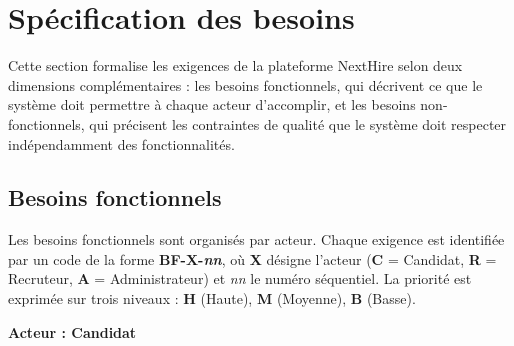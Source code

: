 \section{Spécification des besoins}

Cette section formalise les exigences de la plateforme NextHire selon deux dimensions complémentaires : les besoins fonctionnels, qui décrivent ce que le système doit permettre à chaque acteur d'accomplir, et les besoins non-fonctionnels, qui précisent les contraintes de qualité que le système doit respecter indépendamment des fonctionnalités.

\subsection{Besoins fonctionnels}

Les besoins fonctionnels sont organisés par acteur. Chaque exigence est identifiée par un code de la forme \textbf{BF-X-\textit{nn}}, où \textbf{X} désigne l'acteur (\textbf{C} = Candidat, \textbf{R} = Recruteur, \textbf{A} = Administrateur) et \textit{nn} le numéro séquentiel. La priorité est exprimée sur trois niveaux : \textbf{H} (Haute), \textbf{M} (Moyenne), \textbf{B} (Basse).

\bigskip
\noindent\textbf{Acteur : Candidat}

